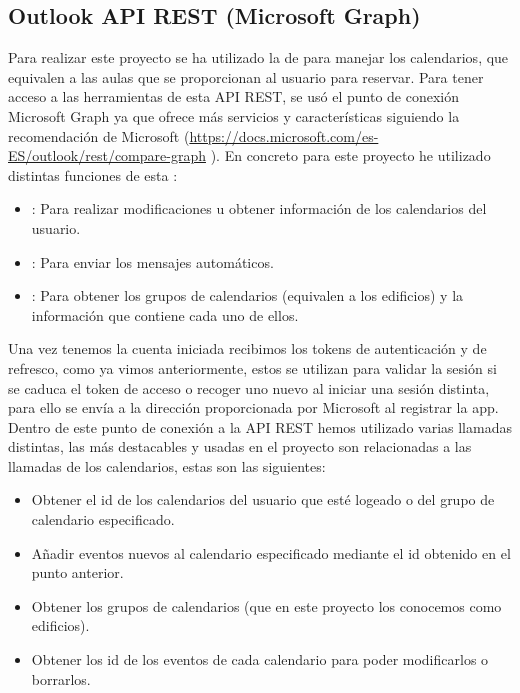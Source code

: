 \subsection{Outlook API REST (Microsoft Graph) }
Para realizar este proyecto se ha utilizado la  de  para manejar los calendarios, que equivalen a las aulas que se proporcionan al usuario para reservar. Para tener acceso a las herramientas de esta API REST, se usó el punto de conexión Microsoft Graph ya que ofrece más servicios y características siguiendo la recomendación de Microsoft (\url{https://docs.microsoft.com/es-ES/outlook/rest/compare-graph} \cite{microsoftGraph}).
En concreto para este proyecto he utilizado distintas funciones de esta :
\begin{itemize}
    \item {}: Para realizar modificaciones u obtener información de los calendarios del usuario.
    \item {}: Para enviar los mensajes automáticos.
    \item {}: Para obtener los grupos de calendarios (equivalen a los edificios) y la información que contiene cada uno de ellos.
\end{itemize}
Una vez tenemos la cuenta iniciada recibimos los tokens de autenticación y de refresco, como ya vimos anteriormente, estos se utilizan para validar la sesión si se caduca el token de acceso o recoger uno nuevo al iniciar una sesión distinta, para ello se envía a la dirección proporcionada por Microsoft al registrar la app.\newline
Dentro de este punto de conexión a la API REST hemos utilizado varias llamadas distintas, las más destacables y usadas en el proyecto son relacionadas a las llamadas de los calendarios, estas son las siguientes:
\begin{itemize}
    \item Obtener el id de los calendarios del usuario que esté logeado o del grupo de calendario especificado.
    \item Añadir eventos nuevos al calendario especificado mediante el id obtenido en el punto anterior.
    \item Obtener los grupos de calendarios (que en este proyecto los conocemos como edificios).
    \item Obtener los id de los eventos de cada calendario para poder modificarlos o borrarlos.
\end{itemize}



